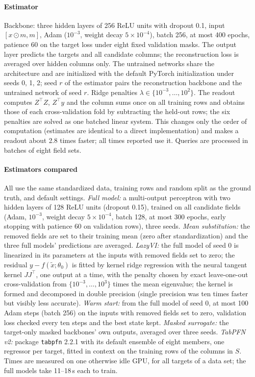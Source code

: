 \paragraph{Estimator} Backbone: three hidden layers of 256 ReLU units with dropout 0.1, input
$[x\odot m, m]$, Adam ($10^{-3}$, weight decay $5\times10^{-4}$), batch 256, at most 400 epochs,
patience 60 on the target loss under eight fixed validation masks. The output layer predicts the targets and all
candidate columns; the reconstruction loss is averaged over hidden columns only. The untrained networks share the
architecture and are initialized with the default PyTorch initialization under seeds 0, 1, 2; seed $r$ of the estimator pairs
the reconstruction backbone and the untrained network of seed $r$. Ridge penalties $\lambda\in\{10^{-3},\dots,10^{2}\}$.
The readout computes $Z^{\top}Z$, $Z^{\top}y$ and the column sums once on all training rows and obtains those of each
cross-validation fold by subtracting the held-out rows; the six penalties are solved as one batched linear system. This
changes only the order of computation (estimates are identical to a direct implementation) and makes a readout about
2.8 times faster; all times reported use it. Queries are processed in batches of eight field sets.

\paragraph{Estimators compared} All use the same standardized data, training rows and random split as the ground truth,
and default settings. \emph{Full model:} a multi-output perceptron with two hidden layers of 128 ReLU units (dropout 0.15),
trained on all candidate fields (Adam, $10^{-3}$, weight decay $5\times10^{-4}$, batch 128, at most 300 epochs, early stopping
with patience 60 on validation rows), three seeds. \emph{Mean substitution:} the removed fields are set to their training
mean (zero after standardization) and the three full models' predictions are averaged. \emph{LazyVI:} the full model of seed 0
is linearized in its parameters at the inputs with removed fields set to zero; the residual $y-f(\tilde x;\theta_0)$ is fitted
by kernel ridge regression with the neural tangent kernel $JJ^{\top}$, one output at a time, with the penalty chosen by exact
leave-one-out cross-validation from $\{10^{-3},\dots,10^{3}\}$ times the mean eigenvalue; the kernel is formed and decomposed in
double precision (single precision was ten times faster but visibly less accurate). \emph{Warm start:} from the full model of
seed 0, at most 100 Adam steps (batch 256) on the inputs with removed fields set to zero, validation loss checked every ten
steps and the best state kept. \emph{Masked surrogate:} the target-only masked backbones' own outputs, averaged over three
seeds. \emph{TabPFN v2:} package \texttt{tabpfn} 2.2.1 with its default ensemble of eight members, one regressor per target,
fitted in context on the training rows of the columns in $S$. Times are measured on one otherwise idle GPU, for all targets of
a data set; the full models take 11--18\,s each to train.

